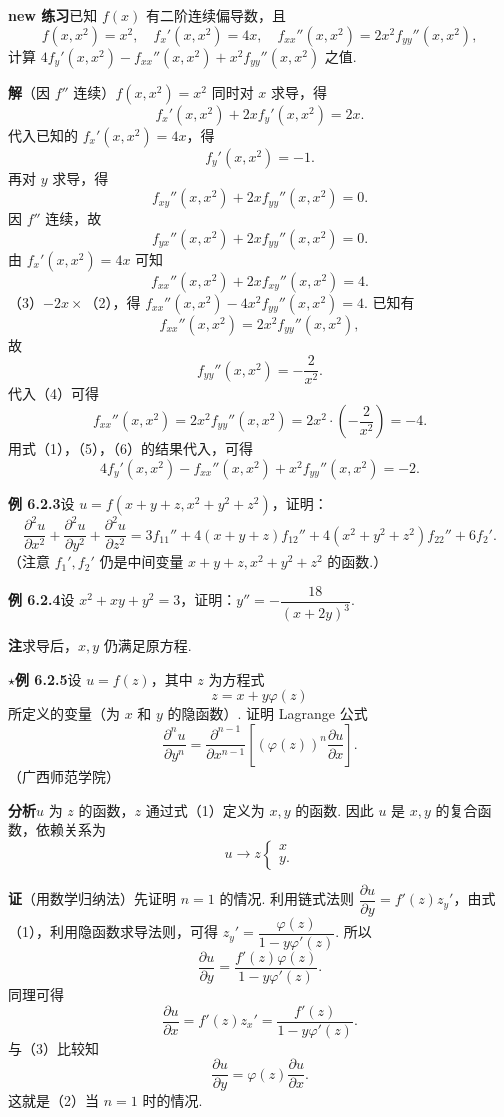 \documentclass[UTF8, 12pt, fontset=fandol, oneside]{ctexart}
\begin{document}
\noindent\textbf{new 练习}\quad 已知 $f(x)$ 有二阶连续偏导数，且
\[
  f(x,x^2)=x^2,\quad f_x'(x,x^2)=4x,\quad f_{xx}''(x,x^2)=2x^2f_{yy}''(x,x^2),
\]
计算 $4f_y'(x,x^2)-f_{xx}''(x,x^2)+x^2f_{yy}''(x,x^2)$ 之值.

\noindent\textbf{解}\quad （因 $f''$ 连续）$f(x,x^2)=x^2$ 同时对 $x$ 求导，得
\[
  f_x'(x,x^2)+2xf_y'(x,x^2)=2x.
\]
代入已知的 $f_x'(x,x^2)=4x$，得
\[
  f_y'(x,x^2)=-1. \tag{1}
\]
再对 $y$ 求导，得
\[
  f_{xy}''(x,x^2)+2xf_{yy}''(x,x^2)=0. \tag{2}
\]
因 $f''$ 连续，故
\[
  f_{yx}''(x,x^2)+2xf_{yy}''(x,x^2)=0.
\]
由 $f_x'(x,x^2)=4x$ 可知
\[
  f_{xx}''(x,x^2)+2xf_{xy}''(x,x^2)=4. \tag{3}
\]
（3）$-2x\times$（2），得 $f_{xx}''(x,x^2)-4x^2f_{yy}''(x,x^2)=4$. 已知有
\[
  f_{xx}''(x,x^2)=2x^2f_{yy}''(x,x^2), \tag{4}
\]
故
\[
  f_{yy}''(x,x^2)=-\frac2{x^2}. \tag{5}
\]
代入（4）可得
\[
  f_{xx}''(x,x^2)=2x^2f_{yy}''(x,x^2)=2x^2\cdot\left(-\frac2{x^2}\right)=-4. \tag{6}
\]
用式（1），（5），（6）的结果代入，可得
\[
  4f_y'(x,x^2)-f_{xx}''(x,x^2)+x^2f_{yy}''(x,x^2)=-2.
\]

\noindent\textbf{例 6.2.3}\quad 设 $u=f(x+y+z,x^2+y^2+z^2)$，证明：
\[
  \frac{\partial^2u}{\partial x^2}+\frac{\partial^2u}{\partial y^2}+\frac{\partial^2u}{\partial z^2}
  =3f_{11}''+4(x+y+z)f_{12}''+4(x^2+y^2+z^2)f_{22}''+6f_2'.
\]
（注意 $f_1',f_2'$ 仍是中间变量 $x+y+z,x^2+y^2+z^2$ 的函数.）

\noindent\textbf{例 6.2.4}\quad 设 $x^2+xy+y^2=3$，证明：$y''=-\dfrac{18}{(x+2y)^3}$.

\noindent\textbf{注}\quad 求导后，$x,y$ 仍满足原方程.

\noindent\textbf{\ensuremath{\star}例 6.2.5}\quad 设 $u=f(z)$，其中 $z$ 为方程式
\[
  z=x+y\varphi(z) \tag{1}
\]
所定义的变量（为 $x$ 和 $y$ 的隐函数）. 证明 Lagrange 公式
\[
  \frac{\partial^nu}{\partial y^n}
  =\frac{\partial^{n-1}}{\partial x^{n-1}}\left[(\varphi(z))^n\frac{\partial u}{\partial x}\right]. \tag{2}
\]
（广西师范学院）

\noindent\textbf{分析}\quad $u$ 为 $z$ 的函数，$z$ 通过式（1）定义为 $x,y$ 的函数. 因此 $u$ 是 $x,y$ 的复合函数，依赖关系为
\[
  u\longrightarrow z\begin{cases}x\\y.\end{cases}
\]

\noindent\textbf{证}\quad （用数学归纳法）先证明 $n=1$ 的情况. 利用链式法则 $\dfrac{\partial u}{\partial y}=f'(z)z_y'$，由式（1），利用隐函数求导法则，可得 $z_y'=\dfrac{\varphi(z)}{1-y\varphi'(z)}$. 所以
\[
  \frac{\partial u}{\partial y}
  =\frac{f'(z)\varphi(z)}{1-y\varphi'(z)}. \tag{3}
\]
同理可得
\[
  \frac{\partial u}{\partial x}=f'(z)z_x'=\frac{f'(z)}{1-y\varphi'(z)}.
\]
与（3）比较知
\[
  \frac{\partial u}{\partial y}=\varphi(z)\frac{\partial u}{\partial x}. \tag{4}
\]
这就是（2）当 $n=1$ 时的情况.
\end{document}
